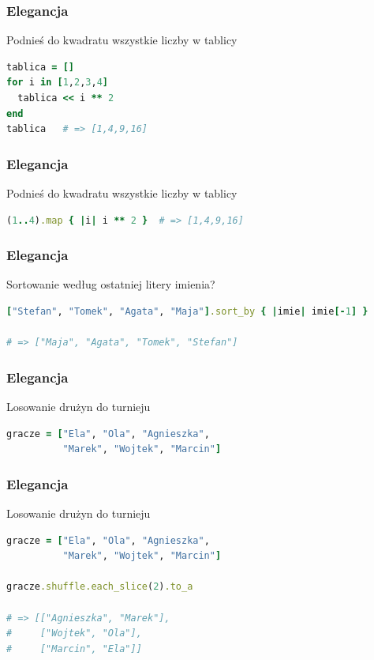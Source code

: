 
\begin{frame}[fragile]
\frametitle{Elegancja}
\begin{block}{Podnieś do kwadratu wszystkie liczby w tablicy}
\begin{lstlisting}[language=Ruby]
tablica = []
for i in [1,2,3,4]
  tablica << i ** 2
end
tablica   # => [1,4,9,16]
\end{lstlisting}
\end{block}
\end{frame}
\begin{frame}[fragile]
\frametitle{Elegancja}
\begin{block}{Podnieś do kwadratu wszystkie liczby w tablicy}
\begin{lstlisting}[language=Ruby]
(1..4).map { |i| i ** 2 }  # => [1,4,9,16]
\end{lstlisting}
\end{block}
\end{frame}

\begin{frame}[fragile]
\frametitle{Elegancja}
\begin{block}{Sortowanie według ostatniej litery imienia?}
\begin{lstlisting}[language=Ruby,basicstyle=\tiny\ttfamily]
["Stefan", "Tomek", "Agata", "Maja"].sort_by { |imie| imie[-1] }

# => ["Maja", "Agata", "Tomek", "Stefan"]
\end{lstlisting}
\end{block}
\end{frame}
\begin{frame}[plain]
\end{frame}

\begin{frame}[fragile]
\frametitle{Elegancja}
\begin{block}{Losowanie drużyn do turnieju}
\begin{lstlisting}[language=Ruby]
gracze = ["Ela", "Ola", "Agnieszka",
          "Marek", "Wojtek", "Marcin"]
\end{lstlisting}
\end{block}
\end{frame}
\begin{frame}[fragile]
\frametitle{Elegancja}
\begin{block}{Losowanie drużyn do turnieju}
\begin{lstlisting}[language=Ruby]
gracze = ["Ela", "Ola", "Agnieszka",
          "Marek", "Wojtek", "Marcin"]

gracze.shuffle.each_slice(2).to_a

# => [["Agnieszka", "Marek"],
#     ["Wojtek", "Ola"],
#     ["Marcin", "Ela"]]
\end{lstlisting}
\end{block}
\end{frame}

